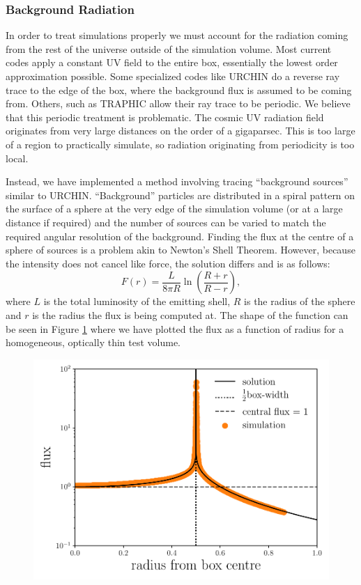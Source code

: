 \documentclass[fleq,usenatbib]{mnras}
\begin{document}
\subsubsection{Background Radiation}
In order to treat simulations properly we must account for the radiation 
coming from the rest of the universe outside of the simulation volume. Most 
current codes apply a constant UV field to the entire box, essentially the 
lowest order approximation possible. Some specialized codes like URCHIN 
\citep{altayTheuns13} do a reverse ray trace to the edge of the box, where the 
background flux is assumed to be coming from. Others, such as TRAPHIC 
\citep{pawlikSchaye08} allow their ray trace to be periodic. We believe
that this periodic treatment is problematic. The cosmic UV radiation field 
originates from very large distances on the order of a gigaparsec. This is too 
large of a region to practically simulate, so radiation originating from 
periodicity is too local.

Instead, we have implemented a method involving tracing ``background sources'' 
similar to URCHIN. ``Background'' particles are distributed in a spiral 
pattern on the surface of a sphere at the very edge of the simulation volume 
(or at a large distance if required) and the number of sources can be varied 
to match the required angular resolution of the background. Finding the flux 
at the centre of a sphere of sources is a problem akin to Newton's Shell 
Theorem. However, because the intensity does not cancel like force, the 
solution differs and is as follows:
\begin{equation}
\label{eqn:cosmof}
F(r) = \frac{L}{8\pi R} \ln \left(\frac{R+r}{R-r}\right),
\end{equation}
where $L$ is the total luminosity of the emitting shell, $R$ is the radius of 
the sphere and $r$ is the radius the flux is being computed at. The shape of 
the function can be seen in Figure \ref{fig:cosmof} where we have plotted the 
flux as a function of radius for a homogeneous, optically thin test volume.
\begin{figure}
\includegraphics[width=1\linewidth]{Figures/cosmofield.pdf}
\caption{}
\label{fig:cosmof}
\end{figure}
\end{document}
